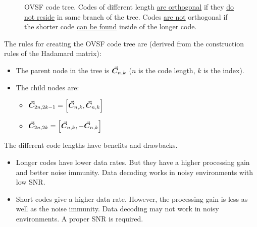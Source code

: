 \begin{refsection}
\begin{figure}[H]
	\caption[\acs{OVSF} code tree]{\acs{OVSF} code tree. Codes of different length \underline{are orthogonal} if they \underline{do not reside} in same branch of the tree. Codes \underline{are not} orthogonal if the shorter code \underline{can be found} inside of the longer code.}
	\label{fig:ch07:ovsf_code_tree}
\end{figure}

The rules for creating the \acs{OVSF} code tree are (derived from the construction rules of the Hadamard matrix):
\begin{itemize}
	\item The parent node in the tree is $\vec{\bm{C}}_{n,k}$ ($n$ is the code length, $k$ is the index).
	\item The child nodes are:
	\begin{itemize}
		\item $\vec{\bm{C}}_{2n,2k-1} = \left[\vec{\bm{C}}_{n,k}, \vec{\bm{C}}_{n,k}\right]$
		\item $\vec{\bm{C}}_{2n,2k} = \left[\vec{\bm{C}}_{n,k}, -\vec{\bm{C}}_{n,k}\right]$
	\end{itemize}
\end{itemize}

The different code lengths have benefits and drawbacks.
\begin{itemize}
	\item Longer codes have lower data rates. But they have a higher processing gain and better noise immunity. Data decoding works in noisy environments with low \ac{SNR}.
	\item Short codes give a higher data rate. However, the processing gain is less as well as the noise immunity. Data decoding may not work in noisy environments. A proper \ac{SNR} is required.
\end{itemize}


\end{refsection}
